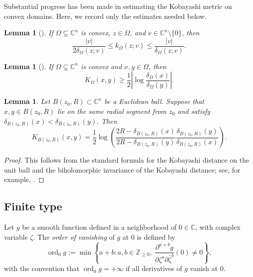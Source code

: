 \documentclass[11pt]{article}
\newtheorem{lemma}[theorem]{Lemma}
\theoremstyle{definition}
\newcommand{\C}{\mathbb{C}}
\DeclareMathOperator{\ord}{ord}
\begin{document}
Substantial progress has been made in estimating the Kobayashi metric
on convex domains.  Here, we record only the estimates needed below.

\begin{lemma}[{\cite[Theorem~5]{GrahamConvex}}]
\label{lem:graham}
If \(\Omega\subsetneq\C^n\) is convex, \(z\in\Omega\), and \(v\in\C^n\setminus\{0\}\), then
\begin{equation*}
 \frac{|v|}{2\delta_\Omega(z;v)}
 \le k_\Omega(z;v)
 \le\frac{|v|}{\delta_\Omega(z;v)}.
\end{equation*}
\end{lemma}

\begin{lemma}[{\cite[Proposition~3(i)]{NikolovTrybula}}]
\label{lem:normal-lower}
	If \(\Omega\subsetneq\C^n\) is convex and
	\(x,y\in\Omega\), then
	\begin{equation*}
		K_\Omega(x,y)
		\ge
		\frac12
		\left|
		\log\frac{\delta_\Omega(x)}{\delta_\Omega(y)}
		\right|.
	\end{equation*}
\end{lemma}

\begin{lemma}\label{lem:ball-radial-distance}
Let \(B(z_0,R)\subset\C^n\) be a Euclidean ball.  Suppose that \(x,y\in B(z_0,R)\) lie on the same radial segment from \(z_0\) and satisfy
\(\delta_{B(z_0,R)}(x)<\delta_{B(z_0,R)}(y)\).
Then
\[
K_{B(z_0,R)}(x,y)
=
\frac12
\log
\left(
\frac{2R-\delta_{B(z_0,R)}(x)}
     {2R-\delta_{B(z_0,R)}(y)}
\frac{\delta_{B(z_0,R)}(y)}
     {\delta_{B(z_0,R)}(x)}
\right).
\]
\end{lemma}
\begin{proof}
This follows from the standard formula for the Kobayashi distance on
the unit ball and the biholomorphic invariance of the Kobayashi
distance; see, for example,
\cite[Corollary~2.3.5 and Theorem~11.2.1]{JP}.
\end{proof}


\subsection{Finite type}
\label{subsec:finite-type}

Let \(g\) be a smooth function defined in a neighborhood of \(0\in\C\), with complex variable \(\zeta\). The \emph{order of vanishing} of \(g\) at \(0\) is defined by
\[
\ord_0 g:=\min\left\{a+b:a,b\in\mathbb Z_{\ge0},\ \frac{\partial^{a+b}g}{\partial\zeta^a\partial\bar\zeta^b}(0)\ne0\right\},
\]
with the convention that \(\ord_0 g=+\infty\) if all derivatives of \(g\) vanish at \(0\).
\end{document}
